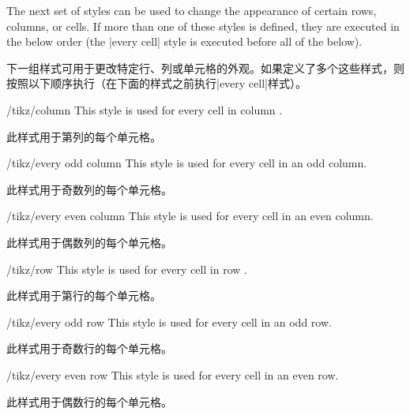 The next set of styles can be used to change the appearance of certain rows,
columns, or cells. If more than one of these styles is defined, they are
executed in the below order (the |every cell| style is executed before all of
the below).

下一组样式可用于更改特定行、列或单元格的外观。如果定义了多个这些样式，则按照以下顺序执行（在下面的样式之前执行|every cell|样式）。

%
\begin{stylekey}{/tikz/column }
    This style is used for every cell in column .

    此样式用于第列的每个单元格。

  \end{stylekey}

\begin{stylekey}{/tikz/every odd column}
    This style is used for every cell in an odd column.

    此样式用于奇数列的每个单元格。

  \end{stylekey}

\begin{stylekey}{/tikz/every even column}
    This style is used for every cell in an even column.

    此样式用于偶数列的每个单元格。

  \end{stylekey}

\begin{stylekey}{/tikz/row }
    This style is used for every cell in row .

    此样式用于第行的每个单元格。

  \end{stylekey}

\begin{stylekey}{/tikz/every odd row}
    This style is used for every cell in an odd row.

    此样式用于奇数行的每个单元格。

  \end{stylekey}

\begin{stylekey}{/tikz/every even row}
    This style is used for every cell in an even row.

    此样式用于偶数行的每个单元格。

  \end{stylekey}

